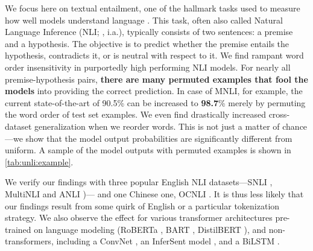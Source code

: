 \documentclass[letterpaper, 12pt]{report}
\begin{document}
We focus here on textual entailment, one of the hallmark tasks used to measure how well models understand language \citep{condoravdi-etal-2003-entailment, Dagan2005:RTE}. This task, often also called Natural Language Inference (NLI; \citealt{bowman-etal-2015-large}, i.a.), typically consists of two sentences: a premise and a hypothesis. The objective is to predict whether the premise entails the hypothesis, contradicts it, or is neutral with respect to it.  We find rampant word order insensitivity in purportedly high performing NLI models. %
For nearly all premise-hypothesis pairs, \textbf{there are many permuted examples that fool the models} into providing the correct prediction. In case of MNLI, for example, the current state-of-the-art of 90.5\% can be increased to \textbf{98.7}\% merely by permuting the word order of test set examples. We even find drastically increased cross-dataset generalization when we reorder words. This is not just a matter of chance---we show that the model output probabilities are significantly different from uniform. A sample of the model outputs with permuted examples is shown in \autoref{tab:unli:example}.

We verify our findings with three popular English NLI datasets---SNLI \citep{bowman-etal-2015-large}, MultiNLI \citep{williams-etal-2018-broad} and ANLI \citep{nie-etal-2020-adversarial})---%
and one Chinese one, OCNLI \cite{hu-etal-2020-ocnli}. It is thus less likely that our findings result from some quirk of English or a particular tokenization strategy.
We also observe the effect for various transformer architectures pre-trained on language modeling (RoBERTa \citep{liu-et-al-2019-roberta}, BART \citep{lewis-etal-2020-bart}, DistilBERT \citep{sanh2020distilbert}), and non-transformers, including a ConvNet  \citep{zhao2015self}, an InferSent model \citep{conneau-etal-2017-supervised}, and a BiLSTM \citep{collobert2008unified}.
\end{document}
